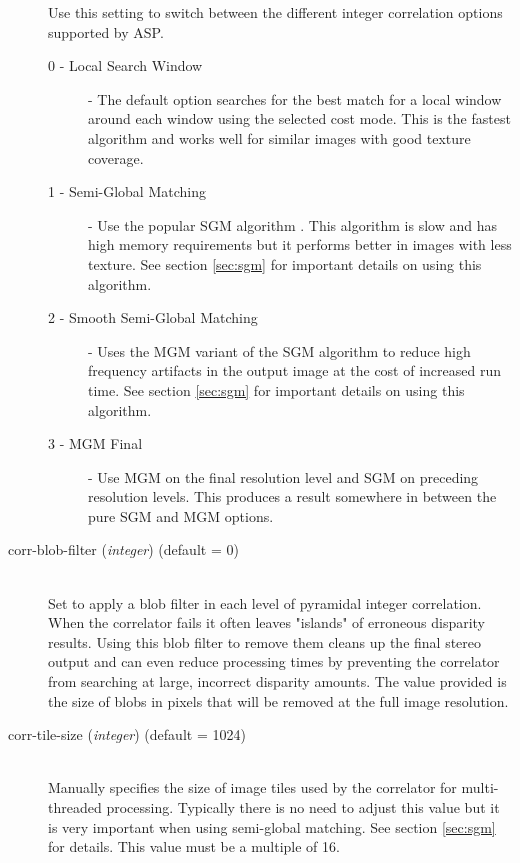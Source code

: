 \begin{description}
  Use this setting to switch between the different integer correlation options supported by ASP.  
  \begin{description}
    \item[0 - Local Search Window] - The default option searches for the best match
    for a local window around each window using the selected cost mode.  This is the 
    fastest algorithm and works well for similar images with good texture coverage.

    \item[1 - Semi-Global Matching] - Use the popular SGM algorithm \citep{hirschmuller_sgm_original}.
    This algorithm is slow and has high memory requirements but it performs better in images with
    less texture.  See section \ref{sec:sgm} for important details on using this algorithm.

    \item[2 - Smooth Semi-Global Matching] - Uses the MGM variant of the SGM algorithm 
    \citep{facciolo2015mgm} to reduce high frequency artifacts in the output image at the cost 
    of increased run time. See section \ref{sec:sgm} for important details on using this algorithm.
    
    \item[3 - MGM Final] - Use MGM on the final resolution level and SGM on preceding resolution levels.
    This produces a result somewhere in between the pure SGM and MGM options.
    
  \end{description}

\item[corr-blob-filter \textnormal{\small{(\emph{integer})}} (default = 0)]\hfill \\

  Set to apply a blob filter in each level of pyramidal integer correlation.
  When the correlator fails it often leaves "islands" of erroneous disparity results.
  Using this blob filter to remove them cleans up the final stereo output and
  can even reduce processing times by preventing the correlator from searching
  at large, incorrect disparity amounts.  The value provided is the size of blobs
  in pixels that will be removed at the full image resolution.

\item[corr-tile-size \textnormal{\small{(\emph{integer})}} (default = 1024)]\hfill \\

  Manually specifies the size of image tiles used by the correlator for multi-threaded
  processing. Typically there is no need to adjust this value but it is very important
  when using semi-global matching. See section \ref{sec:sgm} for details.  This value
  must be a multiple of 16.


\end{description}
